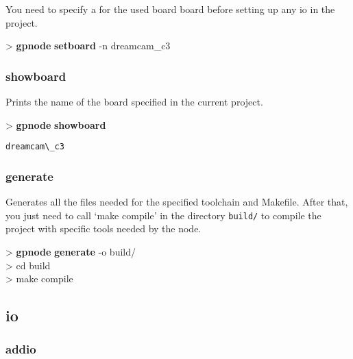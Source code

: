 \documentclass[10pt,a4paper]{article}
\begin{document}
You need to specify a for the used board board before setting up any io in the project.

\begin{sampletitle}
> \textbf{gpnode} \textbf{setboard} -n dreamcam\_c3
\end{sampletitle}


\subsubsection{showboard}

Prints the name of the board specified in the current project.

\begin{sampletitle}
> \textbf{gpnode} \textbf{showboard}
\begin{Verbatim}
dreamcam\_c3
\end{Verbatim}
\end{sampletitle}


\subsubsection{generate}

Generates all the files needed for the specified toolchain and Makefile. After that, you just need to call `make compile' in the directory \texttt{build/} to compile the project with specific tools needed by the node.

\begin{sampletitle}
> \textbf{gpnode} \textbf{generate} -o build/\\
> cd build\\
> make compile
\end{sampletitle}

\subsection{io}
\subsubsection{addio}
\end{document}
